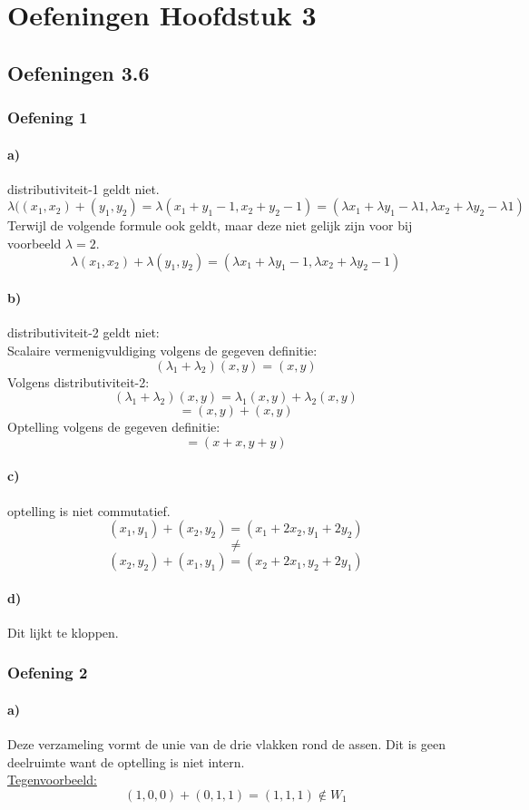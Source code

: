\documentclass[lineaire_algebra_oplossingen.tex]{subfiles}
\begin{document}
\chapter{Oefeningen Hoofdstuk 3}
\section{Oefeningen 3.6}
\subsection{Oefening 1}
\subsubsection*{a)}
distributiviteit-1 geldt niet.
\[
\lambda((x_1,x_2) + (y_1,y_2)  = \lambda(x_1+y_1-1,x_2+y_2-1) = (\lambda x_1+\lambda y_1-\lambda 1,\lambda x_2+\lambda y_2-\lambda 1)
\]
Terwijl de volgende formule ook geldt, maar deze niet gelijk zijn voor bij voorbeeld $\lambda = 2$.
\[
\lambda(x_1,x_2) + \lambda(y_1,y_2) = (\lambda x_1+\lambda y_1- 1,\lambda x_2+\lambda y_2-1)
\]
\subsubsection*{b)}
distributiviteit-2 geldt niet:\\
Scalaire vermenigvuldiging volgens de gegeven definitie:
$$
(\lambda_1 + \lambda_2)(x,y) = (x,y)
$$
Volgens distributiviteit-2:
$$
(\lambda_1 + \lambda_2)(x,y) = \lambda_1(x,y) + \lambda_2(x,y)
$$
$$
= (x,y) + (x,y)
$$
Optelling volgens de gegeven definitie:
$$
= (x+x, y+y)
$$

\subsubsection*{c)}
optelling is niet commutatief.
\[
(x_1,y_1) + (x_2,y_2) = (x_1+2x_2,y_1+2y_2)
\]
\[ \neq \]
\[
(x_2,y_2) + (x_1,y_1) = (x_2+2x_1,y_2+2y_1)
\]

\subsubsection*{d)}
Dit lijkt te kloppen.

\subsection{Oefening 2}
\subsubsection*{a)}
Deze verzameling vormt de unie van de drie vlakken rond de assen. Dit is geen deelruimte want de optelling is niet intern.\\
\underline{Tegenvoorbeeld:}\\
\[
(1,0,0) + (0,1,1) = (1,1,1) \not \in W_1
\]
\end{document}
